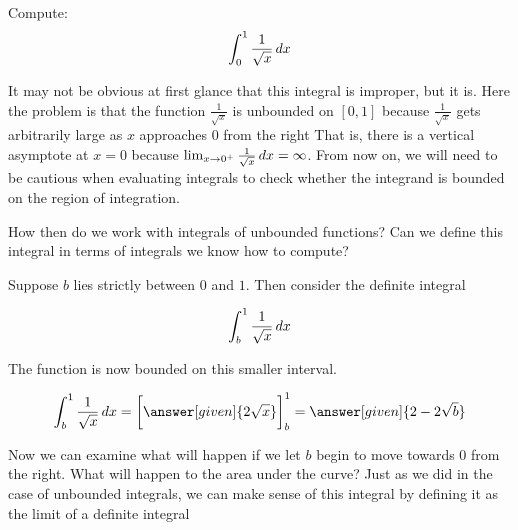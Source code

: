 \documentclass{ximera}
\begin{document}
\begin{example}
  Compute:
  \[
  \int_{0}^1 \frac{1}{\sqrt{x}} \mathop{}\!d x
  \]
  \begin{explanation}
It may not be obvious at first glance that this integral is improper, but it is.  Here the problem is that the function $\frac{1}{\sqrt{x}}$ is unbounded on $[0,1]$ because $\frac{1}{\sqrt{x}}$ gets arbitrarily large as $x$ approaches $0$ from the right That is, there is a vertical asymptote at $x=0$ because $\lim_{x \to 0^+} \frac{1}{\sqrt{x}} \mathop{}\!d x = \infty$. From now on, we will need to be cautious when evaluating integrals to check whether the integrand is bounded on the region of integration.

How then do we work with integrals of unbounded functions?  Can we define this integral in terms of integrals we know how to compute?

Suppose $b$ lies strictly between $0$ and $1$. Then consider the definite integral

\[
\int_{b}^{1} \frac{1}{\sqrt{x}} \mathop{}\!d x
\]

\begin{image}
\end{image}

The function is now bounded on this smaller interval.

\[
\int_{b}^1 \frac{1}{\sqrt{x}} \d x=  \eval{\answer[given]{2\sqrt{x}}}_b^1=\answer[given]{2-2\sqrt{b}}
\]

Now we can examine what will happen if we let $b$ begin to move towards $0$ from the right. What will happen to the area under the curve?
Just as we did in the case of unbounded integrals, we can make sense of this integral by defining it as the limit of a definite integral


\end{explanation}
\end{example}
\end{document}
